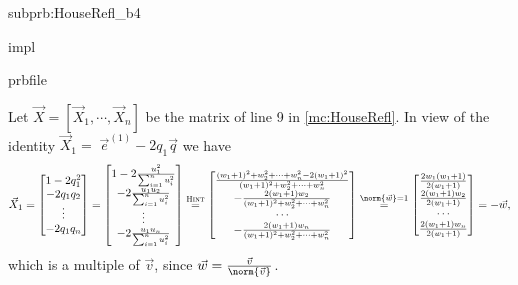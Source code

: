 \begin{problem}
\begin{subproblem}{subprb:HouseRefl_b}{4}
  \begin{samwriteprbpart}{impl}
    \begin{writeverbatim}{prbfile}
      \begin{samsolution}
        Let $\vec{X} = [\vec{X}_1, \cdots, \vec{X}_n]$ be the matrix
        of line 9 in \autoref{mc:HouseRefl}. In view of the identity
        $\vec{X}_1 = \;  \vec{e}^{(1)} - 2 q_1 \vec{q} $ we have
        \[
          \vec{X}_1 = \begin{bmatrix}
            1 -2q_1^2 \\ -2q_1q_2 \\ \vdots \\ -2q_1q_n
          \end{bmatrix}
          = \begin{bmatrix}
            1 - 2 \frac{u_1^2}{\sum_{i = 1}^n u_i^2} \\
            - 2 \frac{u_1 u_2}{\sum_{i = 1}^n u_i^2} \\
            \vdots \\
            - 2 \frac{u_1 u_n}{\sum_{i = 1}^n u_i^2}
          \end{bmatrix}
          \overset{\textsc{Hint}}{=} \begin{bmatrix}
            \frac{(w_1+1)^2 + w_2^2 + \cdots + w_n^2 - 2(w_1+1)^2}{(w_1+1)^2 + w_2^2 + \cdots + w_n^2} \\
            - \frac{2(w_1+1)w_2}{(w_1+1)^2 + w_2^2 + \cdots + w_n^2} \\
            \cdots \\
            - \frac{2(w_1+1)w_n}{(w_1+1)^2 + w_2^2 + \cdots + w_n^2}
          \end{bmatrix}
          \overset{\norm{\vec{w}} = 1}{=} \begin{bmatrix}
            \frac{2w_1(w_1+1)}{2(w_1+1)} \\
            \frac{2(w_1+1)w_2}{2(w_1+1)} \\
            \cdots \\
            \frac{2(w_1+1)w_n}{2(w_1+1)} \\
          \end{bmatrix}
          = - \vec{w},
        \]
        which is a multiple of $\vec{v}$, since
        $\vec{w} =  \frac{\vec{v}}{\norm{\vec{v}}}$.
      \end{samsolution}
    \end{writeverbatim}
  \end{samwriteprbpart}
  \end{subproblem}


\end{problem}
